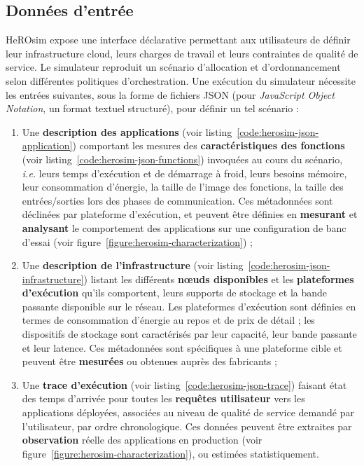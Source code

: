 \subsection{Données d'entrée}

HeROsim expose une interface déclarative permettant aux utilisateurs de définir leur infrastructure cloud, leurs charges de travail et leurs contraintes de qualité de service. Le simulateur reproduit un scénario d'allocation et d'ordonnancement selon différentes politiques d'orchestration. Une exécution du simulateur nécessite les entrées suivantes, sous la forme de fichiers \gls{JSON} (pour \textit{JavaScript Object Notation}, un format textuel structuré), pour définir un tel scénario :

\begin{enumerate}
    \item Une \textbf{description des applications} (voir listing~\ref{code:herosim-json-application}) comportant les mesures des \textbf{caractéristiques des fonctions} (voir listing~\ref{code:herosim-json-functions}) invoquées au cours du scénario, \textit{i.e.} leurs temps d'exécution et de démarrage à froid, leurs besoins mémoire, leur consommation d'énergie, la taille de l'image des fonctions, la taille des entrées/sorties lors des phases de communication. Ces métadonnées sont déclinées par plateforme d'exécution, et peuvent être définies en \textbf{mesurant} et \textbf{analysant} le comportement des applications sur une configuration de banc d'essai (voir figure~\ref{figure:herosim-characterization}) ;
    \item Une \textbf{description de l'infrastructure} (voir listing~\ref{code:herosim-json-infrastructure}) listant les différents \textbf{nœuds disponibles} et les \textbf{plateformes d'exécution} qu'ils comportent, leurs supports de stockage et la bande passante disponible sur le réseau. Les plateformes d'exécution sont définies en termes de consommation d'énergie au repos et de prix de détail ; les dispositifs de stockage sont caractérisés par leur capacité, leur bande passante et leur latence. Ces métadonnées sont spécifiques à une plateforme cible et peuvent être \textbf{mesurées} ou obtenues auprès des fabricants ;
    \item Une \textbf{trace d'exécution} (voir listing~\ref{code:herosim-json-trace}) faisant état des temps d'arrivée pour toutes les \textbf{requêtes utilisateur} vers les applications déployées, associées au niveau de qualité de service demandé par l'utilisateur, par ordre chronologique. Ces données peuvent être extraites par \textbf{observation} réelle des applications en production (voir figure~\ref{figure:herosim-characterization}), ou estimées statistiquement.
\end{enumerate}

